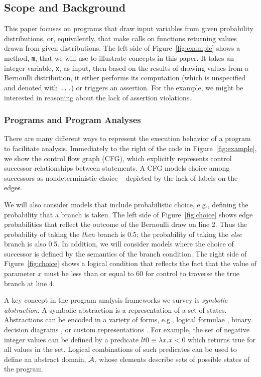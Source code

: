 \subsection{Scope and Background}
\label{sec:background}

This paper focuses on programs that draw input variables
from given probability distributions, or, equivalently, that make
calls on functions returning values drawn from given distributions.
The left side of Figure~\ref{fig:example} shows a method,
\texttt{m}, that we will use to illustrate concepts in this paper.     
It takes an integer variable, \texttt{x}, as input, then based on the 
results of drawing values from a Bernoulli distribution,
it either performs its computation
(which is unspecified and denoted with \texttt{...}) or triggers
an assertion. 
For the example, we might be interested in reasoning about the lack
of assertion violations.



\subsubsection{Programs and Program Analyses}

There are many different ways to represent the execution behavior
of a program to facilitate analysis.  Immediately to the right of
the code in Figure~\ref{fig:example}, we show the control flow graph (CFG),
which explicitly represents control successor relationships between
statements.  A CFG models choice among successors as nondeterministic
choice -- depicted by the lack of labels on the edges.

We will also consider models that include probabilistic choice,
e.g., defining the probability that a branch is taken.
The left side of Figure~\ref{fig:choice} shows edge probabilities
that reflect the outcome of the Bernoulli draw on line 2. Thus the probability 
of taking the {\em then} branch is 0.5; the probability of taking 
the {\em else} branch is also 0.5.
In addition, we will consider models where the
choice of successor is defined by the semantics
of the branch condition.
The right side of Figure~\ref{fig:choice} 
shows a logical condition that 
reflects the fact that the value of parameter $x$ must be
less than or equal to $60$ for control to traverse the true branch at line 4.



A key concept in the program analysis frameworks we survey is
\textit{symbolic abstraction}.  A symbolic abstraction is a 
representation of a set of states.  Abstractions can be encoded
in a variety of forms, e.g., logical formulae \cite{thakur2012bilateral}, binary
decision diagrams \cite{bryant1992symbolic}, or custom representations \cite{bagnara2008parma}.  For example, the set of negative integer values 
can be defined by a predicate 
$lt0 \equiv \lambda x.x<0$ which returns true for all values in the set.
Logical combinations of such predicates can be used to define
an abstract domain, ${\cal A}$, whose elements describe sets of
possible states of the program.

